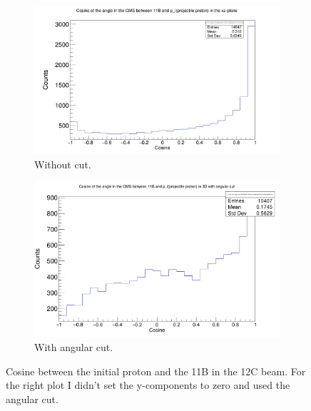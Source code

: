 \documentclass{report}
\begin{document}
\begin{figure}[ht]
\begin{subfigure}{.5\textwidth}
  \centering
  \includegraphics[width=\linewidth]{cos_11B_p_i.png}
  \caption{Without cut.}
  \label{fig:sub-first}
\end{subfigure}
\begin{subfigure}{.5\textwidth}
  \centering
  \includegraphics[width=\linewidth]{cos_11B_p_i_3d_cut.png}
  \caption{With angular cut.}
  \label{fig:sub-second}
\end{subfigure}
\caption{Cosine between the initial proton and the 11B in the 12C beam. For the right plot I didn't set the y-components to zero and used the angular cut.}
\label{fig:cos_11B_p_i_3d_cut}
\end{figure}
\end{document}
